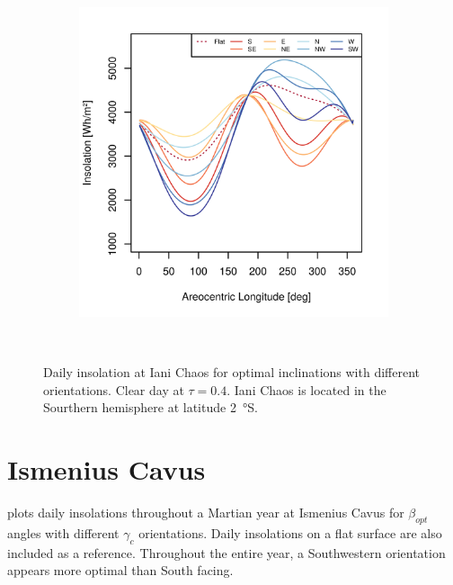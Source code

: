 \begin{figure}[h]
\begin{subfigure}[t]{\subfigureWidth}
            \includegraphics[height=\graphicsHeight]{sections/appendix/optimal-angles/plots/iani-chaos-tau-04-and-beta-optimal-based-on-solar-insolation.png}
            \label{fig:sub:optimal-angles-iani-chaos-based-on-insolation}
    \end{subfigure}\\[0.8ex]
    \caption[Daily insolation at Iani Chaos for optimal inclinations with different orientations]
    {Daily insolation at Iani Chaos for optimal inclinations with different orientations. Clear day at $\tau=0.4$. Iani Chaos is located in the Sourthern hemisphere at latitude \SI{2}{\degree}S.}
    \label{fig:plot:optimal-angles-iani-chaos}
\vspace{-2ex}
\end{figure}

\section{Ismenius Cavus}

 plots daily insolations throughout a Martian year at Ismenius Cavus for $\beta_{opt}$ angles with different $\gamma_{c}$ orientations. Daily insolations on a flat surface are also included as a reference. Throughout the entire year, a Southwestern orientation appears more optimal than South facing.

